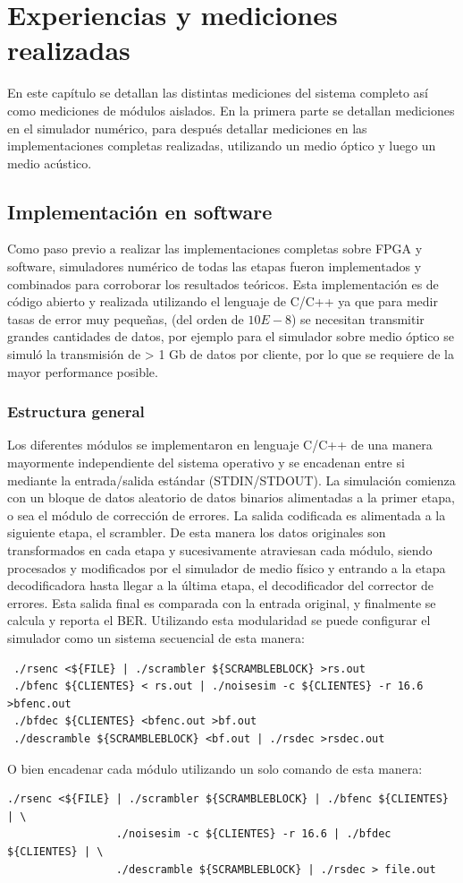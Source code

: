 \chapter{Experiencias y mediciones realizadas}
\label{simulations}
En este capítulo se detallan las distintas mediciones del sistema completo así como mediciones de módulos aislados. 
En la primera parte se detallan mediciones en el simulador numérico, para después detallar mediciones en las implementaciones completas realizadas, utilizando un medio óptico y luego un medio acústico.
\section{Implementación en software}
Como paso previo a realizar las implementaciones completas sobre FPGA y software, simuladores numérico de todas las etapas fueron implementados y combinados para corroborar los resultados teóricos. Esta implementación es de código abierto y realizada utilizando el lenguaje de C/C++ ya que para medir tasas de error muy pequeñas, (del orden de $10E-8$) se necesitan transmitir grandes cantidades de datos, por ejemplo para el simulador sobre medio óptico se simuló la transmisión de > 1 Gb de datos por cliente, por lo que se requiere de la mayor performance posible.
\subsection{Estructura general}
Los diferentes módulos se implementaron en lenguaje C/C++ de una manera mayormente independiente del sistema operativo y se encadenan entre si mediante la entrada/salida estándar (STDIN/STDOUT). La simulación comienza con un bloque de datos aleatorio de datos binarios alimentadas a la primer etapa, o sea el módulo de corrección de errores. La salida codificada es alimentada a la siguiente etapa, el scrambler. De esta manera los datos originales son transformados en cada etapa y sucesivamente atraviesan cada módulo, siendo procesados y modificados por el simulador de medio físico y entrando a la etapa decodificadora hasta llegar a la última etapa, el decodificador del corrector de errores. Esta salida final es comparada con la entrada original, y finalmente se calcula y reporta el BER.
Utilizando esta modularidad se puede configurar el simulador como un sistema secuencial de esta manera:

\small
\begin{verbatim}
 ./rsenc <${FILE} | ./scrambler ${SCRAMBLEBLOCK} >rs.out
 ./bfenc ${CLIENTES} < rs.out | ./noisesim -c ${CLIENTES} -r 16.6 >bfenc.out
 ./bfdec ${CLIENTES} <bfenc.out >bf.out
 ./descramble ${SCRAMBLEBLOCK} <bf.out | ./rsdec >rsdec.out
\end{verbatim}
\normalsize
O bien encadenar cada módulo utilizando un solo comando de esta manera:
\small
\begin{verbatim}
./rsenc <${FILE} | ./scrambler ${SCRAMBLEBLOCK} | ./bfenc ${CLIENTES} | \
                 ./noisesim -c ${CLIENTES} -r 16.6 | ./bfdec ${CLIENTES} | \ 
                 ./descramble ${SCRAMBLEBLOCK} | ./rsdec > file.out
\end{verbatim}
\normalsize

